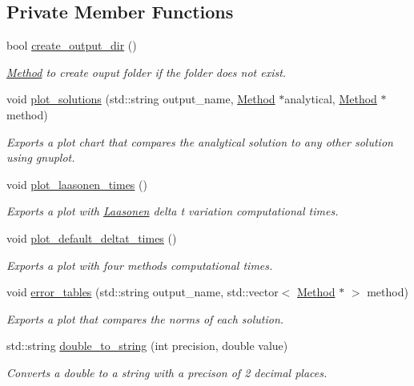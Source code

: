 \subsection*{Private Member Functions}
\begin{DoxyCompactItemize}
\item 
bool \hyperlink{classIOManager_a9798220ef88ebb14ffd354a04351862d}{create\+\_\+output\+\_\+dir} ()
\begin{DoxyCompactList}\small\item\em \hyperlink{classMethod}{Method} to create ouput folder if the folder does not exist. \end{DoxyCompactList}\item 
void \hyperlink{classIOManager_a149183e073e33890810fe6801bc4861f}{plot\+\_\+solutions} (std\+::string output\+\_\+name, \hyperlink{classMethod}{Method} $\ast$analytical, \hyperlink{classMethod}{Method} $\ast$method)
\begin{DoxyCompactList}\small\item\em Exports a plot chart that compares the analytical solution to any other solution using gnuplot. \end{DoxyCompactList}\item 
void \hyperlink{classIOManager_addf56e894f0331609d821bd515887f84}{plot\+\_\+laasonen\+\_\+times} ()
\begin{DoxyCompactList}\small\item\em Exports a plot with \hyperlink{classLaasonen}{Laasonen} delta t variation computational times. \end{DoxyCompactList}\item 
void \hyperlink{classIOManager_a12b636be3c0bab9b90ed042f450ebe8d}{plot\+\_\+default\+\_\+deltat\+\_\+times} ()
\begin{DoxyCompactList}\small\item\em Exports a plot with four methods computational times. \end{DoxyCompactList}\item 
void \hyperlink{classIOManager_a32ba797e6d5cbd6f0f8d3856b62848a2}{error\+\_\+tables} (std\+::string output\+\_\+name, std\+::vector$<$ \hyperlink{classMethod}{Method} $\ast$ $>$ method)
\begin{DoxyCompactList}\small\item\em Exports a plot that compares the norms of each solution. \end{DoxyCompactList}\item 
std\+::string \hyperlink{classIOManager_ac0848cdaa155421cd6904650823bdc9e}{double\+\_\+to\+\_\+string} (int precision, double value)
\begin{DoxyCompactList}\small\item\em Converts a double to a string with a precison of 2 decimal places. \end{DoxyCompactList}\end{DoxyCompactItemize}
